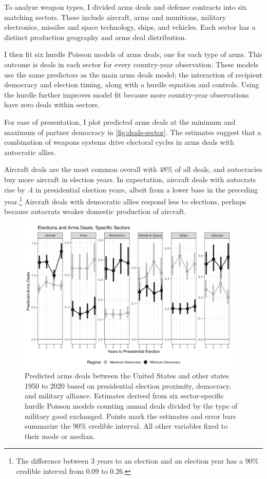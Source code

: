 \documentclass[12pt]{article}
\begin{document}
To analyze weapon types, I divided arms deals and defense contracts into six matching sectors. 
These include aircraft, arms and munitions, military electronics, missiles and space technology, ships, and vehicles.  
Each sector has a distinct production geography and arms deal distribution.


I then fit six hurdle Poisson models of arms deals, one for each type of arms. 
This outcome is deals in each sector for every country-year observation. 
These models use the same predictors as the main arms deals model; the interaction of recipient democracy and election timing, along with a hurdle equation and controls.
Using the hurdle further improves model fit because more country-year observations have zero deals within sectors. 


For ease of presentation, I plot predicted arms deals at the minimum and maximum of partner democracy in \autoref{fig:deals-sector}.
The estimates suggest that a combination of weapons systems drive electoral cycles in arms deals with autocratic allies.  


Aircraft deals are the most common overall with 48\% of all deals, and autocracies buy more aircraft in election years.
In expectation, aircraft deals with autocrats rise by .4 in presidential election years, albeit from a lower base in the preceding year.\footnote{The difference between 3 years to an election and an election year has a 90\% credible interval from 0.09 to 0.26.}
Aircraft deals with democratic allies respond less to elections, perhaps because autocrats weaker domestic production of aircraft. 


\begin{figure}[htpb]
	\centering
		\includegraphics[width=0.95\textwidth]{../figures/deals-sector.png}
	\caption{Predicted arms deals between the United States and other states 1950 to 2020 based on presidential election proximity, democracy, and military alliance. Estimates derived from six sector-specific hurdle Poisson models counting annual deals divided by the type of military good exchanged. Points mark the estimates and error bars summarize the 90\% credible interval. All other variables fixed to their mode or median.}
	\label{fig:deals-sector}
\end{figure}
\end{document}
